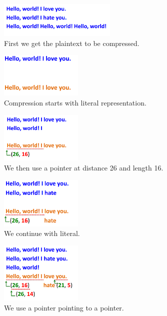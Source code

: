 \begin{figure}[H] \caption{First we get the plaintext to be compressed.} \centering \includegraphics[width=0.5\textwidth]{diagrams/lz77_1.png}\end{figure}
\begin{figure}[H] \caption{Compression starts with literal representation.} \centering \includegraphics[width=0.35\textwidth]{diagrams/lz77_2.png}\end{figure}
\begin{figure}[H] \caption{We then use a pointer at distance 26 and length 16.} \centering \includegraphics[width=0.35\textwidth]{diagrams/lz77_3.png}\end{figure}
\begin{figure}[H] \caption{We continue with literal.} \centering \includegraphics[width=0.35\textwidth]{diagrams/lz77_4.png}\end{figure}
\begin{figure}[H] \caption{We use a pointer pointing to a pointer.} \centering \includegraphics[width=0.35\textwidth]{diagrams/lz77_5.png}\end{figure}
